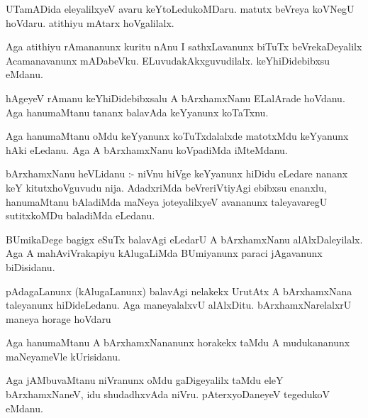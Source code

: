 \documentclass{article}
\begin{document}
\begin{mn}
UTamADida  eleyalilxyeV  avaru  keYtoLedukoMDaru.  matutx  beVreya  koVNegU  hoVdaru.  atithiyu  mAtarx  hoVgalilalx.
\end{mn}

\begin{mn}
Aga  atithiyu  rAmananunx  kuritu  nAnu  I  sathxLavanunx  biTuTx  beVrekaDeyalilx  Acamanavanunx  mADabeVku.  
ELuvudakAkxguvudilalx.  keYhiDidebibxsu  eMdanu.
\end{mn}

\begin{mn}
hAgeyeV  rAmanu  keYhiDidebibxsalu  A  bArxhamxNanu  ELalArade  hoVdanu.  Aga  hanumaMtanu  tananx  balavAda  keYyanunx  koTaTxnu.
\end{mn}

\begin{mn}
Aga  hanumaMtanu  oMdu  keYyanunx  koTuTxdalalxde  matotxMdu  keYyanunx  hAki  eLedanu.  Aga  A  bArxhamxNanu  koVpadiMda  iMteMdanu.
\end{mn}

\begin{mn}
bArxhamxNanu  heVLidanu :- niVnu  hiVge  keYyanunx  hiDidu  eLedare  nananx  keY  kitutxhoVguvudu  nija.  AdadxriMda  beVreriVtiyAgi  
ebibxsu  enanxlu,  hanumaMtanu  bAladiMda  maNeya  joteyalilxyeV  avananunx  taleyavaregU  sutitxkoMDu  baladiMda  eLedanu.
\end{mn}

\begin{mn}
BUmikaDege  bagigx  eSuTx  balavAgi  eLedarU  A  bArxhamxNanu  alAlxDaleyilalx.  Aga  A  mahAviVrakapiyu  kAlugaLiMda  BUmiyanunx  
paraci  jAgavanunx  biDisidanu.
\end{mn}

\begin{mn}
pAdagaLanunx (kAlugaLanunx)  balavAgi  nelakekx  UrutAtx  A  bArxhamxNana  taleyanunx  hiDideLedanu.  Aga  maneyalalxvU  alAlxDitu.  
bArxhamxNarelalxrU  maneya  horage  hoVdaru
\end{mn}

\begin{mn}
Aga  hanumaMtanu  A  bArxhamxNananunx  horakekx  taMdu  A  mudukananunx  maNeyameVle  kUrisidanu.
\end{mn}

\begin{mn}
Aga  jAMbuvaMtanu  niVranunx  oMdu  gaDigeyalilx  taMdu  eleY  bArxhamxNaneV,  idu  shudadhxvAda  niVru.  pAterxyoDaneyeV  tegedukoV  eMdanu.
\end{mn}
\end{document}
